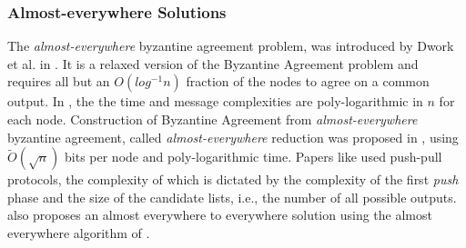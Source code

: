 \subsubsection{Almost-everywhere Solutions}
The \textit{almost-everywhere} byzantine agreement problem, was introduced by Dwork et al. in \cite{DPPU88}. It is a relaxed version of the Byzantine Agreement problem and requires all but an $O(log^{-1}n)$ fraction of the nodes to agree on a common output. In \cite{KSSV06}, the the time and message complexities are poly-logarithmic in $n$ for each node. Construction of Byzantine Agreement from \textit{almost-everywhere} byzantine agreement, called \textit{almost-everywhere} reduction was proposed in \cite{KS09,KLST11}, using $\tilde{O}(\sqrt{n})$ bits per node and poly-logarithmic time. 
Papers like \cite{KLST11} used push-pull protocols, the complexity of which is dictated by the complexity of the first \textit{push} phase and the size of the candidate lists, i.e., the number of all possible outputs. \cite{BGH13}  also proposes an almost everywhere to everywhere solution using the almost everywhere algorithm of \cite{KSSV06}.


